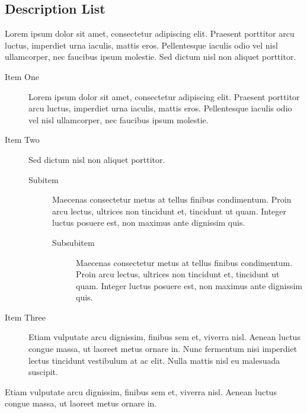 \documentclass[
	a4paper, %
	12pt, %
]{CSSullivanBusinessReport}
\begin{document}

\subsection{Description List}

Lorem ipsum dolor sit amet, consectetur adipiscing elit. Praesent porttitor arcu luctus, imperdiet urna iaculis, mattis eros. Pellentesque iaculis odio vel nisl ullamcorper, nec faucibus ipsum molestie. Sed dictum nisl non aliquet porttitor.

\begin{description}
	\item[Item One] Lorem ipsum dolor sit amet, consectetur adipiscing elit. Praesent porttitor arcu luctus, imperdiet urna iaculis, mattis eros. Pellentesque iaculis odio vel nisl ullamcorper, nec faucibus ipsum molestie.
	\item[Item Two] Sed dictum nisl non aliquet porttitor.
	\begin{description}
		\item[Subitem] Maecenas consectetur metus at tellus finibus condimentum. Proin arcu lectus, ultrices non tincidunt et, tincidunt ut quam. Integer luctus posuere est, non maximus ante dignissim quis.
		\begin{description}
			\item[Subsubitem] Maecenas consectetur metus at tellus finibus condimentum. Proin arcu lectus, ultrices non tincidunt et, tincidunt ut quam. Integer luctus posuere est, non maximus ante dignissim quis.
	\end{description}
	\end{description}
	\item[Item Three] Etiam vulputate arcu dignissim, finibus sem et, viverra nisl. Aenean luctus congue massa, ut laoreet metus ornare in. Nunc fermentum nisi imperdiet lectus tincidunt vestibulum at ac elit. Nulla mattis nisl eu malesuada suscipit.
\end{description}

Etiam vulputate arcu dignissim, finibus sem et, viverra nisl. Aenean luctus congue massa, ut laoreet metus ornare in.
\end{document}
